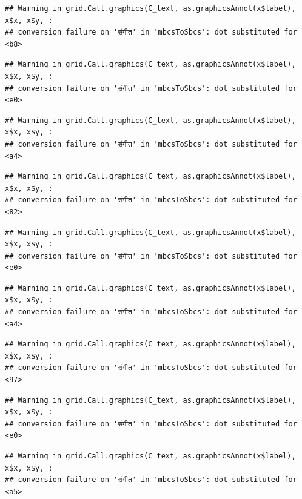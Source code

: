 \documentclass[
]{article}
\begin{document}
\begin{verbatim}
## Warning in grid.Call.graphics(C_text, as.graphicsAnnot(x$label), x$x, x$y, :
## conversion failure on 'संगीत' in 'mbcsToSbcs': dot substituted for <b8>
\end{verbatim}

\begin{verbatim}
## Warning in grid.Call.graphics(C_text, as.graphicsAnnot(x$label), x$x, x$y, :
## conversion failure on 'संगीत' in 'mbcsToSbcs': dot substituted for <e0>
\end{verbatim}

\begin{verbatim}
## Warning in grid.Call.graphics(C_text, as.graphicsAnnot(x$label), x$x, x$y, :
## conversion failure on 'संगीत' in 'mbcsToSbcs': dot substituted for <a4>
\end{verbatim}

\begin{verbatim}
## Warning in grid.Call.graphics(C_text, as.graphicsAnnot(x$label), x$x, x$y, :
## conversion failure on 'संगीत' in 'mbcsToSbcs': dot substituted for <82>
\end{verbatim}

\begin{verbatim}
## Warning in grid.Call.graphics(C_text, as.graphicsAnnot(x$label), x$x, x$y, :
## conversion failure on 'संगीत' in 'mbcsToSbcs': dot substituted for <e0>
\end{verbatim}

\begin{verbatim}
## Warning in grid.Call.graphics(C_text, as.graphicsAnnot(x$label), x$x, x$y, :
## conversion failure on 'संगीत' in 'mbcsToSbcs': dot substituted for <a4>
\end{verbatim}

\begin{verbatim}
## Warning in grid.Call.graphics(C_text, as.graphicsAnnot(x$label), x$x, x$y, :
## conversion failure on 'संगीत' in 'mbcsToSbcs': dot substituted for <97>
\end{verbatim}

\begin{verbatim}
## Warning in grid.Call.graphics(C_text, as.graphicsAnnot(x$label), x$x, x$y, :
## conversion failure on 'संगीत' in 'mbcsToSbcs': dot substituted for <e0>
\end{verbatim}

\begin{verbatim}
## Warning in grid.Call.graphics(C_text, as.graphicsAnnot(x$label), x$x, x$y, :
## conversion failure on 'संगीत' in 'mbcsToSbcs': dot substituted for <a5>
\end{verbatim}
\end{document}
